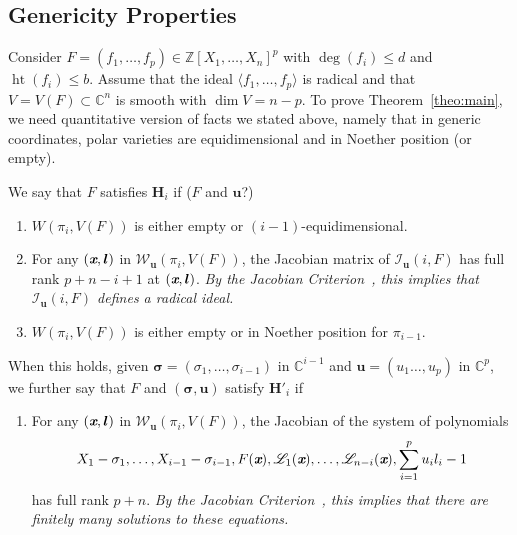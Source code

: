 \documentclass[a4paper]{article}
\def\ub{{\bm u}}
\def\lb{{\bm l}}
\def\xb{\textit{\textbf{x}}}
\DeclareMathOperator{\htt}{ht}
\newcommand{\ZZ}{{\mathbb{Z}}}
\def\C{\mathbb{C}}
\def\Iil{\mathscr{I}_{\ub}(i,F)}
\begin{document}

\subsection{Genericity Properties}\label{sec:gen}
Consider $F= (f_1,\hdots,f_p) \in \ZZ[X_1,\hdots,X_n]^p$ with $\deg(f_i) \leq d$ and $\htt(f_i) \leq b$. Assume that the ideal $\langle f_1,\hdots, f_p \rangle $ is radical and that $V=V(F) \subset \C^n$ is smooth with $\dim V = n-p$. To prove Theorem~\ref{theo:main}, we need quantitative
version of facts we stated above, namely that in generic coordinates,
polar varieties are  equidimensional and in Noether position
(or empty).

We say that $F$ satisfies $\textbf{H}_i$ if ($F$ and $\ub$?)
\begin{enumerate}
\item  $W(\pi_i,V(F))$ is either empty or $(i-1)$-equidimensional.
\item For any $(\xb,\lb)$ in $\mathscr{W}_{\ub}(\pi_i,V(F))$, the Jacobian matrix of $\Iil$ has full rank $p+n-i+1$ at $(\xb,\lb)$. {\em By the Jacobian Criterion~\cite[Corollary 16.20]{ECA}, this
  implies that $\Iil$ defines a radical ideal.}
\item $W(\pi_i,V(F))$ is either empty or in Noether position for
  $\pi_{i-1}$.
\smallskip
\end{enumerate}
When this holds, given $\bm \sigma = (\sigma_1,\hdots,\sigma_{i-1})$ 
in $\C^{i-1}$ and $\ub=(u_1\hdots,u_p)$ in $\C^p$, we further say that $F$ and $(\bm \sigma,\ub)$ satisfy
$\textbf{H}'_i$ if
\begin{enumerate}
\item For any $(\xb,\lb)$ in $\mathscr{W}_{\ub}(\pi_i,V(F))$, the Jacobian of the system of polynomials  
\[
 X_1-\sigma_1,\dots,X_{i-1}-\sigma_{i-1},F(\xb), \mathscr{L}_1(\xb), \hdots, \mathscr{L}_{n-i}(\xb),\sum_{i=1}^pu_il_i-1
\]
has full rank $p+n$. {\em By the Jacobian Criterion~\cite[Corollary 16.20]{ECA}, this implies that there are finitely many solutions to these equations.}
\end{enumerate}
\end{document}
